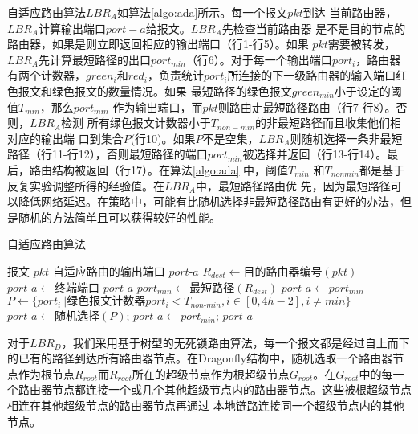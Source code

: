 自适应路由算法$LBR_A$如算法\ref{algo:ada}所示。每一个报文$pkt$到达
当前路由器，$LBR_A$计算输出端口$port-a$给报文。$LBR_A$先检查当前路由器
是不是目的节点的路由器，如果是则立即返回相应的输出端口（行1-行5）。如果
$pkt$需要被转发，$LBR_A$先计算最短路径的出口$port_{min}$（行6）。对于每一个输出端口$port_i$，路由器有两个计数器，$green_i$和$red_i$，负责统计$port_i$所连接的下一级路由器的输入端口红色报文和绿色报文的数量情况。如果
最短路径的绿色报文$green_{min}$小于设定的阈值$T_{min}$，那么$port_{min}$
作为输出端口，而$pkt$则路由走最短路径路由（行7-行8）。否则，$LBR_A$检测
所有绿色报文计数器小于$T_{non-min}$的非最短路径而且收集他们相对应的输出端
口到集合$P$(行10)。如果$P$不是空集，$LBR_A$则随机选择一条非最短路径（行11-行12），否则最短路径的端口$port_{min}$被选择并返回（行13-行14）。最后，路由结构被返回（行17）。在算法\ref{algo:ada} 中，阈值$T_{min}$ 和$T_{nonmin}$都是基于反复实验调整所得的经验值。在$LBR_A$中，最短路径路由优
先，因为最短路径可以降低网络延迟。在策略中，可能有比随机选择非最短路径路由有更好的办法，但是随机的方法简单且可以获得较好的性能。


\begin{algorithm}[t]
  \centering
  \caption{自适应路由算法}
  \label{algo:ada}
  \begin{algorithmic}[1]
    \REQUIRE 报文 $pkt$
    \ENSURE 自适应路由的输出端口 $port\textrm{-}a$
    \STATE $R_{dest} \leftarrow 目的路由器编号(pkt)$
    \STATE $port\textrm{-}a \leftarrow 终端端口$
    \RETURN $port\textrm{-}a$
    \ENDIF
    \STATE $port_{min} \leftarrow 最短路径(R_{dest})$
    \STATE $port\textrm{-}a \leftarrow port_{min}$
    \ELSE
    \STATE $P \leftarrow \{port_i\ |绿色报文计数器{port_i} < T_{non\textrm{-}min}, i \in [0,4h-2], i \neq min\}$\hspace{-1em}
    \STATE $port\textrm{-}a \leftarrow 随机选择(P)$;
    \ELSE
    \STATE $port\textrm{-}a \leftarrow port_{min}$;
    \ENDIF
    \ENDIF
    \RETURN $port\textrm{-}a$
  \end{algorithmic}
\end{algorithm}

对于$LBR_D$，我们采用基于树型的无死锁路由算法，每一个报文都是经过自上而下的已有的路径到达所有路由器节点。在Dragonfly结构中，随机选取一个路由器节点作为根节点$R_{root}$而$R_{root}$所在的超级节点作为根超级节点$G_{root}$。在$G_{root}$中的每一个路由器节点都连接一个或几个其他超级节点内的路由器节点。这些被根超级节点相连在其他超级节点的路由器节点再通过
本地链路连接同一个超级节点内的其他节点。

